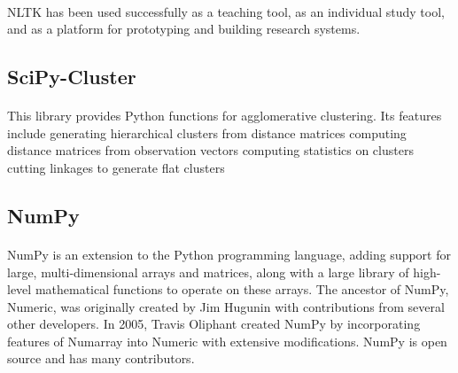 \paragraph{} NLTK has been used successfully as a teaching tool, as an individual study tool, and as a platform for prototyping and building research systems.
\subsection{SciPy-Cluster}
\paragraph{}This library provides Python functions for agglomerative clustering. Its features include  
generating hierarchical clusters from distance matrices 
computing distance matrices from observation vectors 
computing statistics on clusters 
cutting linkages to generate flat clusters 
\subsection{NumPy}
\paragraph{} NumPy is an extension to the Python programming language, adding support for large, multi-dimensional arrays and matrices, along with a large library of high-level mathematical functions to operate on these arrays. The ancestor of NumPy, Numeric, was originally created by Jim Hugunin with contributions from several other developers. In 2005, Travis Oliphant created NumPy by incorporating features of Numarray into Numeric with extensive modifications. NumPy is open source and has many contributors.



    
